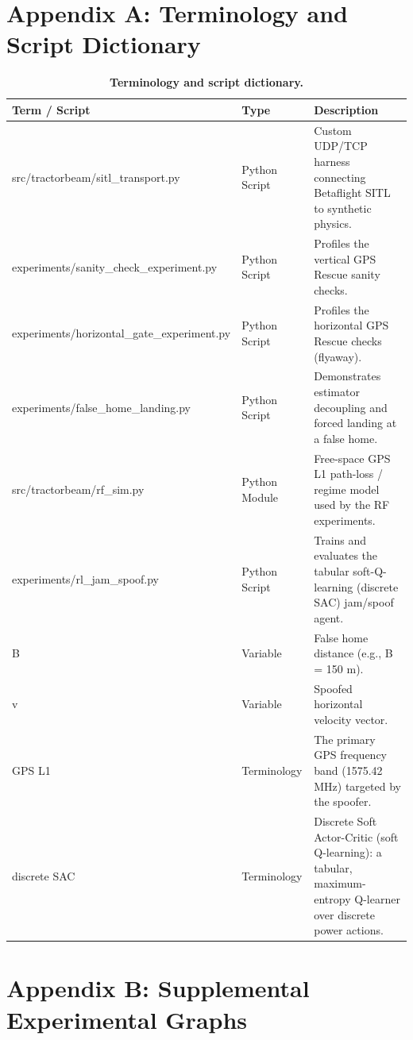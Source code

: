 \documentclass[11pt]{article}
\begin{document}
\section*{Appendix A: Terminology and Script Dictionary}
\begin{table}[H]\centering\small
\caption{\textbf{Terminology and script dictionary.}}
\begin{tabular}{>{\raggedright\arraybackslash}p{2.0in}>{\raggedright\arraybackslash}p{1.0in}>{\raggedright\arraybackslash}p{2.8in}}
\toprule
\textbf{Term / Script} & \textbf{Type} & \textbf{Description} \\
\midrule
src/tractorbeam/sitl\_\allowbreak{}transport.py & Python Script & Custom UDP/TCP harness connecting Betaflight SITL to synthetic physics.\\
experiments/sanity\_\allowbreak{}check\_\allowbreak{}experiment.py & Python Script & Profiles the vertical GPS Rescue sanity checks.\\
experiments/horizontal\_\allowbreak{}gate\_\allowbreak{}experiment.py & Python Script & Profiles the horizontal GPS Rescue checks (flyaway).\\
experiments/false\_\allowbreak{}home\_\allowbreak{}landing.py & Python Script & Demonstrates estimator decoupling and forced landing at a false home.\\
src/tractorbeam/rf\_\allowbreak{}sim.py & Python Module & Free-space GPS L1 path-loss / regime model used by the RF experiments.\\
experiments/rl\_\allowbreak{}jam\_\allowbreak{}spoof.py & Python Script & Trains and evaluates the tabular soft-Q-learning (discrete SAC) jam/spoof agent.\\
B & Variable & False home distance (e.g., B = 150 m).\\
v & Variable & Spoofed horizontal velocity vector.\\
GPS L1 & Terminology & The primary GPS frequency band (1575.42 MHz) targeted by the spoofer.\\
discrete SAC & Terminology & Discrete Soft Actor-Critic (soft Q-learning): a tabular, maximum-entropy Q-learner over discrete power actions. \\
\bottomrule
\end{tabular}
\end{table}

\newpage
\section*{Appendix B: Supplemental Experimental Graphs}
\end{document}
